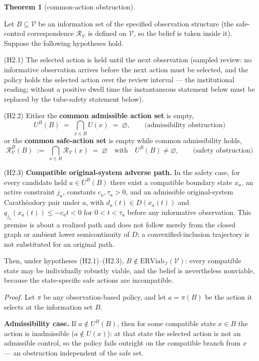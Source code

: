 \documentclass[11pt]{article}
\theoremstyle{definition}
\newtheorem{theorem}{Theorem}
\begin{document}
\begin{theorem}[common-action obstruction]\label{thm:common-action}

Let \(B \subseteq \mathcal{V}\) be an information set of the specified observation structure (the safe-control correspondence
\(\mathcal{R}_{\mathcal{V}}\) is defined on \(\mathcal{V}\), so the
belief is taken inside it). Suppose the following hypotheses hold.

(H2.1) The selected action is held until the next observation (sampled
review: no informative observation arrives before the next action must
be selected, and the policy holds the selected action over the review
interval --- the institutional reading; without a positive dwell time
the instantaneous statement below must be replaced by the tube-safety statement below).

(H2.2) Either the \textbf{common admissible action set} is empty,
\[U^B(B) \;=\; \bigcap_{x \in B} U(x) \;=\; \varnothing, \qquad \text{(admissibility obstruction)}\]
or the \textbf{common safe-action set} is empty while common
admissibility holds,
\[\mathcal{R}_{\mathcal{V}}^B(B) \;:=\; \bigcap_{x \in B} \mathcal{R}_{\mathcal{V}}(x) \;=\; \varnothing \quad \text{with} \quad U^B(B) \neq \varnothing, \tag{1} \qquad \text{(safety obstruction)}\]

(H2.3) \textbf{Compatible original-system adverse path.} In the safety case, for every candidate held \(a\in U^B(B)\) there exist a compatible boundary state \(x_a\), an active constraint \(j_a\), constants \(c_a,\tau_a>0\), and an admissible original-system Carath\'eodory pair under \(a\), with \(d_a(t)\in D(x_a(t))\) and \(q_{j_a}(x_a(t))\le-c_a t<0\) for \(0<t<\tau_a\) before any informative observation. This premise is about a realized path and does not follow merely from the closed graph or ambient lower semicontinuity of \(D\); a convexified-inclusion trajectory is not substituted for an original path.

Then, under hypotheses (H2.1)--(H2.3),
\(B \notin \mathrm{ERViab}_{\mathcal{I}}(\mathcal{V})\): every
compatible state may be individually robustly viable, and the belief is
nevertheless nonviable, because the state-specific safe actions are
incompatible.

\end{theorem}

\emph{Proof.} Let \(\pi\) be any observation-based policy, and let
\(a = \pi(B)\) be the action it selects at the information set \(B\).

\textbf{Admissibility case.} If \(a \notin U^B(B)\), then for some
compatible state \(x \in B\) the action is inadmissible
(\(a \notin U(x)\)): at that state the selected action is not an
admissible control, so the policy fails outright on the compatible
branch from \(x\) --- an obstruction independent of the safe set.
\end{document}
